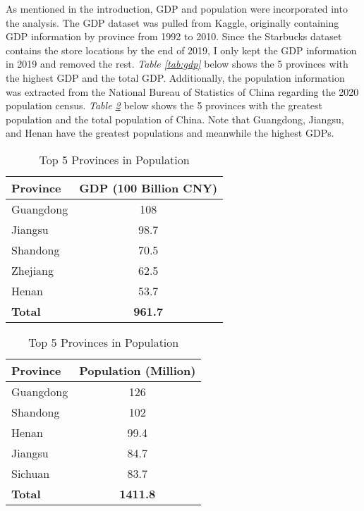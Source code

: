 \documentclass{article}
\begin{document}
As mentioned in the introduction, GDP and population were incorporated into the analysis. The GDP dataset was pulled from Kaggle, originally containing GDP information by province from 1992 to 2010. Since the Starbucks dataset contains the store locations by the end of 2019, I only kept the GDP information in 2019 and removed the rest. \textit{Table \ref{tab:gdp}} below shows the 5 provinces with the highest GDP and the total GDP. Additionally, the population information was extracted from the National Bureau of Statistics of China regarding the 2020 population census. \textit{Table \ref{tab:population}} below shows the 5 provinces with the greatest population and the total population of China. Note that Guangdong, Jiangsu, and Henan have the greatest populations and meanwhile the highest GDPs.

\begin{table}[htbp]
    \centering
    \begin{minipage}{0.48\linewidth}
        \centering
        \begin{tabular}{l c}
            \toprule
            \textbf{Province} & \textbf{GDP (100 Billion CNY)} \\
            \midrule
            Guangdong & 108 \\
            Jiangsu & 98.7 \\
            Shandong & 70.5 \\
            Zhejiang & 62.5 \\
            Henan & 53.7 \\
            \textbf{Total} & \textbf{961.7} \\
            \bottomrule
        \end{tabular}
        \caption{Top 5 Provinces in GDP}
        \label{tab:gdp}
    \end{minipage}
    \quad
    \begin{minipage}{0.48\linewidth}
        \centering
        \begin{tabular}{l c}
            \toprule
            \textbf{Province} & \textbf{Population (Million)} \\
            \midrule
            Guangdong & 126 \\
            Shandong & 102 \\
            Henan & 99.4 \\
            Jiangsu & 84.7 \\
            Sichuan & 83.7 \\
            \textbf{Total} & \textbf{1411.8} \\
            \bottomrule
        \end{tabular}
        \caption{Top 5 Provinces in Population}
        \label{tab:population}
    \end{minipage}
\end{table}
\end{document}
